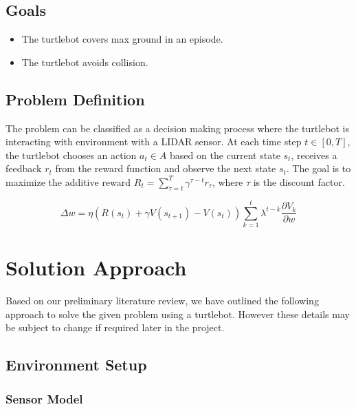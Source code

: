 \documentclass{article}
\begin{document}
\subsection{Goals}
\begin{itemize}
\item The turtlebot covers max ground in an episode.
\item The turtlebot avoids collision.
\end{itemize}
\subsection{Problem Definition}
The problem can be classified as a decision making process where the turtlebot is interacting with environment with a LIDAR sensor. At each time step $t \in [0, T]$, the turtlebot chooses an action $a_t \in A$ based on the current state $s_t$, receives a feedback $r_t$ from the reward function and observe the next state $s_t$. The goal is to maximize the additive reward $R_t = \sum_{\tau=t}^{T}\gamma^{\tau-t}r_{\tau}$, where $\tau$ is the discount factor. 

\[
\Delta w=\eta\left(R(s_{t})+\gamma V(s_{t+1})-V(s_{t})\right)\sum_{k=1}^{t}\lambda^{t-k}\frac{\partial V_{k}}{\partial w}
\]




\section{Solution Approach}
Based on our preliminary literature review, we have outlined the following approach to solve the given problem using a turtlebot. However these details may be subject to change if required later in the project.

\subsection{Environment Setup}
\subsubsection{Sensor Model}
\end{document}
